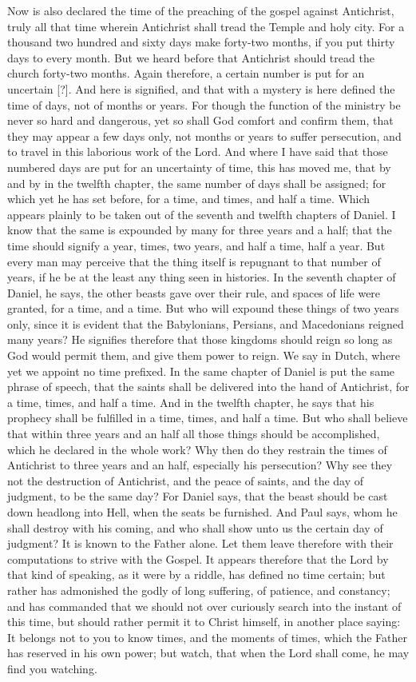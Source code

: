 Now is also declared the time of the preaching of the gospel against Antichrist, truly all that time wherein Antichrist shall tread the Temple and holy city. For a thousand two hundred and sixty days make forty-two months, if you put thirty days to every month. But we heard before that Antichrist should tread the church forty-two months. Again therefore, a certain number is put for an uncertain [?]. And here is signified, and that with a mystery is here defined the time of days, not of months or years. For though the function of the ministry be never so hard and dangerous, yet so shall God comfort and confirm them, that they may appear a few days only, not months or years to suffer persecution, and to travel in this laborious work of the Lord. And where I have said that those numbered days are put for an uncertainty of time, this has moved me, that by and by in the twelfth chapter, the same number of days shall be assigned; for which yet he has set before, for a time, and times, and half a time. Which appears plainly to be taken out of the seventh and twelfth chapters of Daniel. I know that the same is expounded by many for three years and a half; that the time should signify a year, times, two years, and half a time, half a year. But every man may perceive that the thing itself is repugnant to that number of years, if he be at the least any thing seen in histories. In the seventh chapter of Daniel, he says, the other beasts gave over their rule, and spaces of life were granted, for a time, and a time. But who will expound these things of two years only, since it is evident that the Babylonians, Persians, and Macedonians reigned many years? He signifies therefore that those kingdoms should reign so long as God would permit them, and give them power to reign. We say in Dutch, where yet we appoint no time prefixed. In the same chapter of Daniel is put the same phrase of speech, that the saints shall be delivered into the hand of Antichrist, for a time, times, and half a time. And in the twelfth chapter, he says that his prophecy shall be fulfilled in a time, times, and half a time. But who shall believe that within three years and an half all those things should be accomplished, which he declared in the whole work? Why then do they restrain the times of Antichrist to three years and an half, especially his persecution? Why see they not the destruction of Antichrist, and the peace of saints, and the day of judgment, to be the same day? For Daniel says, that the beast should be cast down headlong into Hell, when the seats be furnished. And Paul says, whom he shall destroy with his coming, and who shall show unto us the certain day of judgment? It is known to the Father alone. Let them leave therefore with their computations to strive with the Gospel. It appears therefore that the Lord by that kind of speaking, as it were by a riddle, has defined no time certain; but rather has admonished the godly of long suffering, of patience, and constancy; and has commanded that we should not over curiously search into the instant of this time, but should rather permit it to Christ himself, in another place saying: It belongs not to you to know times, and the moments of times, which the Father has reserved in his own power; but watch, that when the Lord shall come, he may find you watching. 